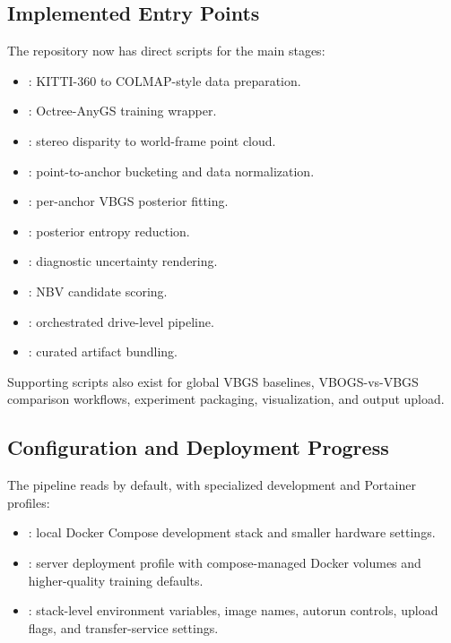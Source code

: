 \documentclass[11pt]{article}
\begin{document}
\subsection{Implemented Entry Points}

The repository now has direct scripts for the main stages:

\begin{itemize}
  \item {}: KITTI-360 to COLMAP-style
        data preparation.
  \item {}: Octree-AnyGS training wrapper.
  \item {}: stereo disparity to
        world-frame point cloud.
  \item {}: point-to-anchor bucketing and data
        normalization.
  \item {}: per-anchor VBGS posterior fitting.
  \item {}: posterior entropy reduction.
  \item {}: diagnostic uncertainty
        rendering.
  \item {}: NBV candidate scoring.
  \item {}: orchestrated drive-level
        pipeline.
  \item {}: curated artifact bundling.
\end{itemize}

Supporting scripts also exist for global VBGS baselines, VBOGS-vs-VBGS
comparison workflows, experiment packaging, visualization, and output upload.

\subsection{Configuration and Deployment Progress}

The pipeline reads  by default, with
specialized development and Portainer profiles:

\begin{itemize}
  \item {}: local Docker Compose development
        stack and smaller hardware settings.
  \item {}: server deployment profile with
        compose-managed Docker volumes and higher-quality training defaults.
  \item {}: stack-level environment variables,
        image names, autorun controls, upload flags, and transfer-service
        settings.
\end{itemize}
\end{document}
